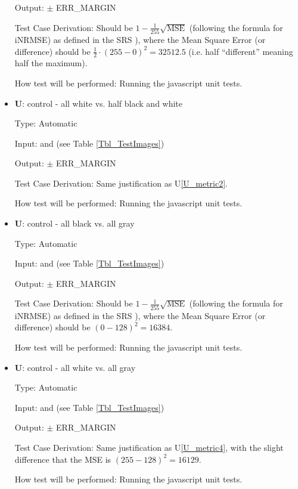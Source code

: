 \documentclass[12pt, titlepage]{article}
\newcommand{\ttref}[1]{Table \ref{#1}}
\newcounter{testnum} %
\newcounter{unittestnum} %
\newcommand{\utref}[1]{U\ref{#1}}
\begin{document}
\begin{itemize}
Output:  $\pm$ ERR\_MARGIN

Test Case Derivation: Should be $1 - \frac{1}{255} \sqrt{\text{MSE}}$ (following the formula for iNRMSE)
as defined in the SRS \cite{SRS}), where the Mean Square Error (or difference)
should be $\frac{1}{2} \cdot (255-0)^2 = 32512.5$ (i.e. half ``different''
meaning half the maximum).

How test will be performed: Running the javascript unit tests.


\item{\textbf{U\theunittestnum \label{U_metric3}}: control - all white vs. half black and white}

Type: Automatic

Input:  and  (see \ttref{Tbl_TestImages})

Output:  $\pm$ ERR\_MARGIN

Test Case Derivation: Same justification as \utref{U_metric2}.

How test will be performed: Running the javascript unit tests.


\item{\textbf{U\theunittestnum \label{U_metric4}}: control - all black vs. all gray}

Type: Automatic

Input:  and  (see \ttref{Tbl_TestImages})

Output:  $\pm$ ERR\_MARGIN

Test Case Derivation: Should be $1 - \frac{1}{255} \sqrt{\text{MSE}}$ (following the formula for iNRMSE)
as defined in the SRS \cite{SRS}), where the Mean Square Error (or difference)
should be $(0-128)^2 = 16384$.

How test will be performed: Running the javascript unit tests.


\item{\textbf{U\theunittestnum \label{U_metric5}}: control - all white vs. all gray}

Type: Automatic

Input:  and  (see \ttref{Tbl_TestImages})

Output:  $\pm$ ERR\_MARGIN

Test Case Derivation: Same justification as \utref{U_metric4}, 
with the slight difference that the MSE is $(255-128)^2 = 16129$.

How test will be performed: Running the javascript unit tests.



\end{itemize}
\end{document}
